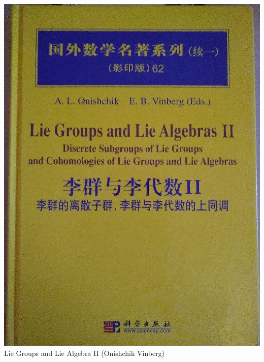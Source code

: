 \documentclass[t]{beamer}
\newcommand{\htarget}[2]{\hypertarget{#1}{#2}}
\begin{document}
\begin{frame}\htarget{LGA2}{} \begin{center}
\includegraphics[height=0.8\textheight]{LieGroups_and_LieAlgebra2_mini.jpg} \\
Lie Groups and Lie Algebra II (Onishchik Vinberg)
\end{center} \end{frame}
\end{document}
